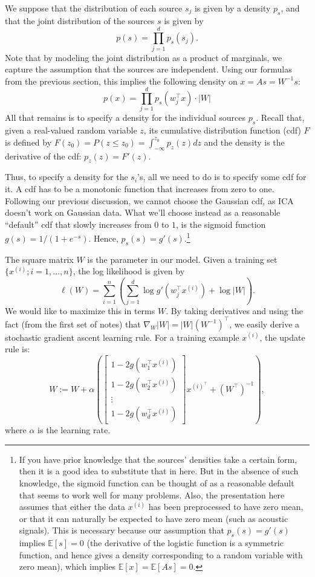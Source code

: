 We suppose that the distribution of each source $s_j$ is given by a density
$p_s$, and that the joint distribution of the sources $s$ is given by
\[
p(s) = \prod_{j=1}^d p_s(s_j).
\]
Note that by modeling the joint distribution as a product of marginals, we
capture the assumption that the sources are independent. Using our formulas
from the previous section, this implies the following density on $x = As = W^{-1} s$:
\[
    p(x) = \prod_{j=1}^d p_s(w^\top_j x) \cdot |W|
\]
All that remains is to specify a density for the individual sources $p_s$.
Recall that, given a real-valued random variable $z$, its cumulative
distribution function (cdf) $F$ is defined by $F(z_0) = P(z \le z_0) = \int_{-\infty}^{z_0} p_z(z) dz$
and the density is the derivative of the cdf: $p_z(z) = F'(z)$.

Thus, to specify a density for the $s_i$'s, all we need to do is to specify some
cdf for it. A cdf has to be a monotonic function that increases from zero
to one. Following our previous discussion, we cannot choose the Gaussian
cdf, as ICA doesn't work on Gaussian data. What we'll choose instead as
a reasonable ``default'' cdf that slowly increases from $0$ to $1$, is the sigmoid
function $g(s) = 1/(1 + e^{-s})$. Hence, $p_s(s) = g'(s)$.\footnote{
If you have prior knowledge that the sources' densities take a certain form, then it
is a good idea to substitute that in here. But in the absence of such knowledge, the
sigmoid function can be thought of as a reasonable default that seems to work well for
many problems. Also, the presentation here assumes that either the data $x^{(i)}$ has been
preprocessed to have zero mean, or that it can naturally be expected to have zero mean
(such as acoustic signals). This is necessary because our assumption that $p_s(s) = g'(s)$
implies $\mathbb E[s] = 0$ (the derivative of the logistic function is a symmetric function, and
hence gives a density corresponding to a random variable with zero mean), which implies
$\mathbb E[x] = \mathbb E[As] = 0$.}

The square matrix $W$ is the parameter in our model. Given a training
set $\{x^{(i)} ;i = 1,\ldots,n\}$, the log likelihood is given by
\[
    \ell(W) = \sum_{i=1}^n \left( \sum_{j=1}^d \log g'(w^\top_j x^{(i)}) + \log|W| \right).
\]
We would like to maximize this in terms $W$. By taking derivatives and using
the fact (from the first set of notes) that $\nabla_W |W| = |W|(W^{-1})^\top$, we easily
derive a stochastic gradient ascent learning rule. For a training example $x^{(i)}$,
the update rule is:
\[
    W := W + \alpha \left( \begin{bmatrix}
        1 - 2g(w^\top_1 x^{(i)})\\
        1 - 2g(w^\top_2 x^{(i)})\\
        \vdots\\
        1 - 2g(w^\top_d x^{(i)})
    \end{bmatrix} x^{(i)^\top} + (W^\top)^{-1} \right),
\]
where $\alpha$ is the learning rate.

